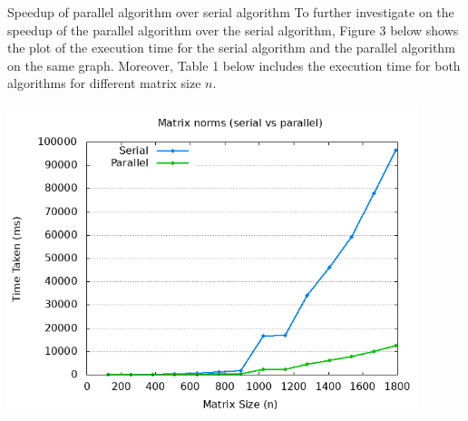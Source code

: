 \documentclass[12pt]{article}
\begin{document}
\pagebreak

\begin{section}{Speedup of parallel algorithm over serial algorithm}
 To further investigate on the speedup of the parallel algorithm over the serial algorithm, Figure 3 below shows the plot of the execution time
 for the serial algorithm and the parallel algorithm on the same graph. Moreover, Table 1 below includes the execution time for both algorithms
 for different matrix size $n$.

 \begin{center}
     \includegraphics*[width=12cm]{images/benchmark_combined.png}
 \end{center}


\end{section}
\end{document}
